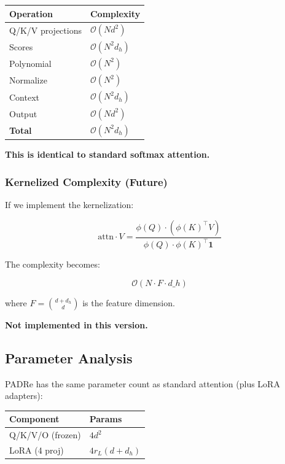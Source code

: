\begin{table}[H]
\centering
\small
\begin{tabular}{ll}
\toprule
\textbf{Operation} & \textbf{Complexity} \\
\midrule
Q/K/V projections & $\mathcal{O}(N d^2)$ \\
Scores & $\mathcal{O}(N^2 d_h)$ \\
Polynomial & $\mathcal{O}(N^2)$ \\
Normalize & $\mathcal{O}(N^2)$ \\
Context & $\mathcal{O}(N^2 d_h)$ \\
Output & $\mathcal{O}(N d^2)$ \\
\textbf{Total} & $\mathcal{O}(N^2 d_h)$ \\
\bottomrule
\end{tabular}
\end{table}

\textbf{This is identical to standard softmax attention.}

\subsubsection{Kernelized Complexity (Future)}

If we implement the kernelization:

\[
\text{attn} \cdot V = \frac{\phi(Q) \cdot (\phi(K)^\top V)}{\phi(Q) \cdot \phi(K)^\top \mathbf{1}}
\tag{4.13}
\]

The complexity becomes:

\[
\mathcal{O}(N \cdot F \cdot d\_h)
\tag{4.14}
\]

where $F = \binom{d + d_h}{d}$ is the feature dimension.

\textbf{Not implemented in this version.}

\subsection{Parameter Analysis}

PADRe has the same parameter count as standard attention (plus LoRA adapters):

\begin{table}[H]
\centering
\small
\begin{tabular}{ll}
\toprule
\textbf{Component} & \textbf{Params} \\
\midrule
Q/K/V/O (frozen) & $4 d^2$ \\
LoRA (4 proj) & $4 r_L (d + d_h)$ \\
\bottomrule
\end{tabular}
\end{table}

